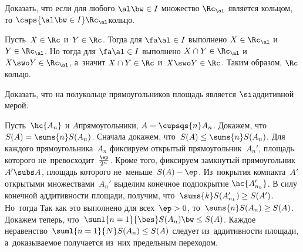 \documentclass[a4paper]{article}
\begin{document}
\begin{problem}
  Доказать, что если для любого $\al \bw \in I$ множество $\Rc_\al$ является кольцом, то
  $\caps{\al \bw\in I} \Rc_\al$\т кольцо.
\end{problem}
\begin{solution}
  Пусть~$X\in\Rc$ и~$Y\in\Rc$. Тогда для $\fa \al \in I$ выполнено $X \in\Rc_\al$ и~$Y\in\Rc_\al$.
  Но тогда для $\fa \al\in I$ выполнено $X\cap Y\in\Rc_\al$ и~$X\swo Y\in\Rc_\al$, а~значит
  $X\cap Y\in\Rc$ и~$X\swo Y\in \Rc$. Таким образом, $\Rc$\Т кольцо.
\end{solution}

\begin{problem}
  Доказать, что на полукольце прямоугольников площадь является $\si$\д аддитивной мерой.
\end{problem}
\begin{solution}
  Пусть~$\hc{A_n}$ и $A$\т прямоугольники, $A = \cupsqs{n} A_n$. Докажем, что~$S(A) =
  \sums{n} S(A_n)$. Сначала докажем, что~$S(A)\le \sums{n} S(A_n)$. Для каждого
  прямоугольника~$A_n$ фиксируем открытый прямоугольник~$A_n'$, площадь которого
  не~превосходит~$\frac{\ep}{2^n}$. Кроме того, фиксируем замкнутый
  прямоугольник~$A'\subs A$, площадь которого не~меньше~$S(A)-\ep$.
  Из~покрытия компакта~$A'$ открытыми множествами~$A_n'$ выделим конечное
  подпокрытие $\hc{A_{n_k}'}$. В силу конечной аддитивности площади, получим,
  что~$\sums{k} S(A_{n_k}')\ge S(A')$. Но~тогда
  Так как это   выполнено для всех~$\ep>0$, то~$\sums{n} S(A_n)\ge S(A)$. Докажем теперь,
  что~$\suml{n=1}{\bes} S(A_n) \bw\le S(A)$. Каждое неравенство~$\suml{n=1}{N}
  S(A_n)\le S(A)$ следует из~аддитивности площади, а~доказываемое получается
  из~них предельным переходом.
\end{solution}
\end{document}
